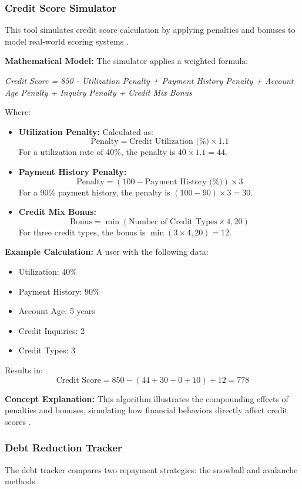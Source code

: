 \documentclass[11pt,twocolumn]{article}
\begin{document}
\subsubsection{Credit Score Simulator}
This tool simulates credit score calculation by applying penalties and bonuses to model real-world scoring systems \cite{creditscore}.

\textbf{Mathematical Model:}
The simulator applies a weighted formula:
\vspace{0.5cm}

\textit {Credit Score = 850 - Utilization Penalty + Payment History Penalty + Account Age Penalty + Inquiry Penalty + Credit Mix Bonus}

\vspace{0.5cm}

Where:
\begin{itemize}
    \item \textbf{Utilization Penalty:} Calculated as:
    \[
    \text{Penalty} = \text{Credit Utilization (\%)} \times 1.1
    \]
    For a utilization rate of 40\%, the penalty is \( 40 \times 1.1 = 44 \).
    \item \textbf{Payment History Penalty:}
    \[
    \text{Penalty} = (100 - \text{Payment History (\%)}) \times 3
    \]
    For a 90\% payment history, the penalty is \( (100 - 90) \times 3 = 30 \).
    \item \textbf{Credit Mix Bonus:}
    \[
    \text{Bonus} = \min(\text{Number of Credit Types} \times 4, 20)
    \]
    For three credit types, the bonus is \( \min(3 \times 4, 20) = 12 \).
\end{itemize}

\textbf{Example Calculation:}  
A user with the following data:
\begin{itemize}
    \item Utilization: 40\%
    \item Payment History: 90\%
    \item Account Age: 5 years
    \item Credit Inquiries: 2
    \item Credit Types: 3
\end{itemize}
Results in:
\[
\text{Credit Score} = 850 - (44 + 30 + 0 + 10) + 12 = 778
\]

\textbf{Concept Explanation:}  
This algorithm illustrates the compounding effects of penalties and bonuses, simulating how financial behaviors directly affect credit scores \cite{fico}.

\subsubsection{Debt Reduction Tracker}
The debt tracker compares two repayment strategies: the snowball and avalanche methods \cite{debtmanagement}.
\end{document}
